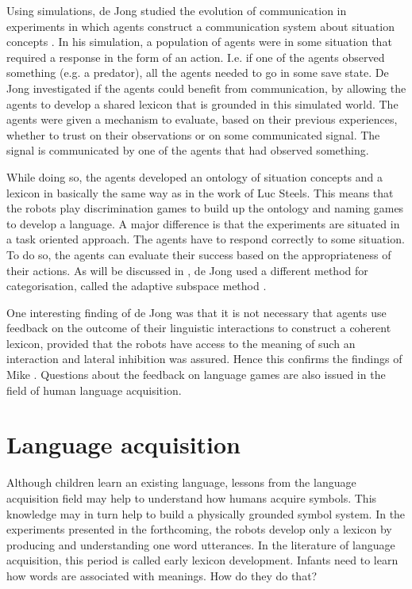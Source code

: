 Using simulations, de Jong studied  the evolution of communication in experiments in which agents construct a communication system about situation concepts \citep{dejong:99b}. In his simulation, a population of agents were in some situation that required a response in the form of an action. I.e.  if one of the agents observed something (e.g. a predator), all the agents needed to go in some save state. De Jong investigated if the agents could benefit from communication, by allowing the agents to develop a shared lexicon that is grounded in this simulated world. The agents were given a mechanism to evaluate, based on their previous experiences, whether to trust on their observations or on some communicated signal. The signal is communicated by one of the agents that had observed something.

While doing so, the agents developed an ontology of situation concepts and a lexicon in basically the same way as in the work of Luc Steels. This means that the robots play discrimination games to build up the ontology and naming games to develop a language. A major difference is that the experiments are situated in a task oriented approach. The agents have to respond correctly to some situation. To do so, the agents can evaluate their success based on the appropriateness of their actions. As will be discussed in , de Jong used a different method for categorisation, called the {\sc adaptive subspace method} \citep{dejongvogt:1998}.

One interesting finding of de Jong was that it is not necessary that agents use feedback on the outcome of their linguistic interactions to construct a coherent lexicon, provided that the robots have access to the meaning of such an interaction and lateral inhibition was assured. Hence this confirms the findings of Mike \citet{oliphant:1998}. Questions about the feedback on language games are also issued in the field of human language acquisition.


\section{Language acquisition}\label{s:intro:acquisition}

Although children learn an existing language, lessons from the language acquisition field may help to understand how humans acquire symbols. This knowledge may in turn help to build a physically grounded symbol system. In the experiments presented in the forthcoming, the robots develop only a lexicon by producing and understanding one word utterances. In the literature of language acquisition, this period is called {\sc early lexicon development}. Infants need to learn how words are associated with meanings. How do they do that?

